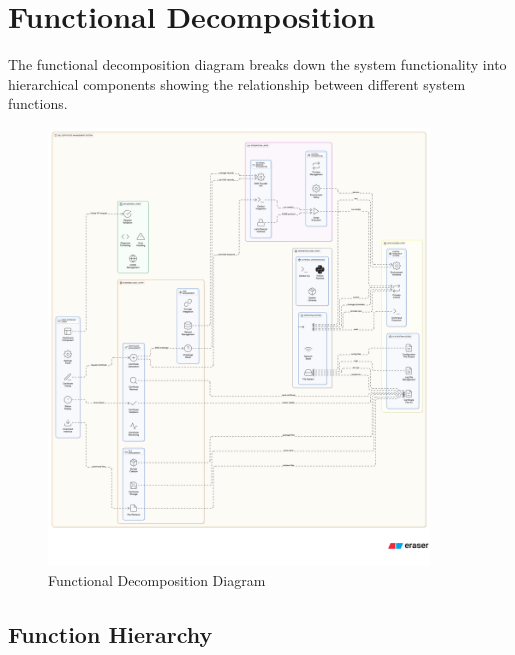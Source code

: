 \section{Functional Decomposition}

The functional decomposition diagram breaks down the system functionality into hierarchical components showing the relationship between different system functions.

\begin{figure}[h]
\centering
\includegraphics[width=0.9\textwidth]{diagram-images/3.9-functional-decomposition.png}
\caption{Functional Decomposition Diagram}
\label{fig:functional-decomposition}
\end{figure}

\subsection{Function Hierarchy}

